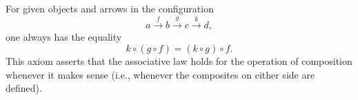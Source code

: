 For given objects and arrows in the configuration
$$a \xrightarrow{f} b \xrightarrow{g} c \xrightarrow{k} d,$$
one always has the equality
$$k \circ (g \circ f) = (k \circ g) \circ f.$$
This axiom asserts that the associative law holds for the operation of composition whenever it makes sense (i.e., whenever the composites on either side are defined).
